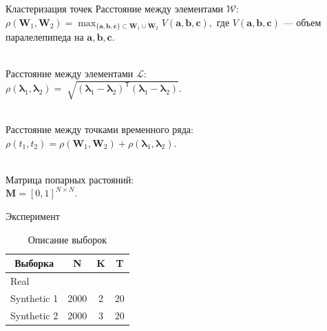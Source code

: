 \documentclass{beamer}
\begin{document}
\begin{frame}{Кластеризация точек}
Расстояние между элементами $\mathcal{W}$:\\
$\rho\left(\textbf{W}_1, \textbf{W}_2\right) = \max_{\{\textbf{a},\textbf{b},\textbf{c}\} \subset \textbf{W}_1\cup \textbf{W}_2 } V\left(\textbf{a},\textbf{b},\textbf{c}\right),$
где $V\left(\textbf{a},\textbf{b},\textbf{c}\right)$ --- объем паралелепипеда на $\textbf{a}, \textbf{b}, \textbf{c}$.

~\\
Расстояние между элементами $\mathcal{L}$:\\
$\rho\left(\bm{\lambda}_1, \bm{\lambda}_2\right) = \sqrt[]{\left(\bm{\lambda}_1 - \bm{\lambda}_2\right)^{\mathsf{T}}\left(\bm{\lambda}_1 - \bm{\lambda}_2\right)}.$

~\\
Расстояние между точками временного ряда:\\
$\rho\left(t_1, t_2\right) = \rho\left(\textbf{W}_1, \textbf{W}_2\right) + \rho\left(\bm{\lambda}_1, \bm{\lambda}_2\right).$

~\\
Матрица попарных растояний:\\
$\textbf{M} = [0, 1]^{N\times N}.$

\end{frame}
\begin{frame}{Эксперимент}
\begin{table}[h]
	\begin{center}
	\caption{Описание выборок}
		\begin{tabular}{|c|c|c|c|}
		\hline
			Выборка &N& K& T\\
			\hline
			\multicolumn{1}{|l|}{Real}
			& & & \\
			\hline
			\multicolumn{1}{|l|}{Synthetic 1}
			& 2000& 2& 20\\
			\hline
			\multicolumn{1}{|l|}{Synthetic 2}
			& 2000& 3& 20\\
		\hline
		\end{tabular}
	\end{center}
\end{table}
\end{frame}
\end{document}
